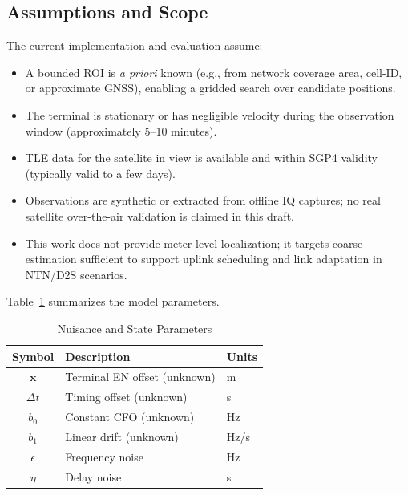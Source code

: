 \subsection{Assumptions and Scope}
The current implementation and evaluation assume:
\begin{itemize}
  \item A bounded ROI is \emph{a priori} known (e.g., from network coverage
        area, cell-ID, or approximate GNSS), enabling a gridded search over
        candidate positions.
  \item The terminal is stationary or has negligible velocity during the
        observation window (approximately 5--10 minutes).
  \item TLE data for the satellite in view is available and within SGP4
        validity (typically valid to a few days).
  \item Observations are synthetic or extracted from offline IQ captures;
        no real satellite over-the-air validation is claimed in this draft.
  \item This work does not provide meter-level localization; it targets
        coarse estimation sufficient to support uplink scheduling and
        link adaptation in NTN/D2S scenarios.
\end{itemize}
Table~\ref{tab:params} summarizes the model parameters.

\begin{table}[h]
  \caption{Nuisance and State Parameters}
  \label{tab:params}
  \centering
  \begin{tabular}{cll}
    \hline
    Symbol & Description & Units \\ \hline
    $\mathbf{x}$ & Terminal EN offset (unknown) & m \\
    $\Delta t$   & Timing offset (unknown) & s \\
    $b_0$        & Constant CFO (unknown)    & Hz \\
    $b_1$        & Linear drift (unknown)    & Hz/s \\
    $\epsilon$   & Frequency noise           & Hz \\
    $\eta$       & Delay noise              & s \\ \hline
  \end{tabular}
\end{table}